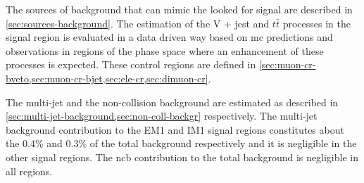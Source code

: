 The sources of background that can mimic the looked for signal are described in
\cref{sec:sources-background}. The estimation of the V + jest and $t \bar{t}$
processes in the signal region is evaluated in a data driven way based on
\gls{mc} predictions and observations in regions of the phase space where an
enhancement of these processes is expected. These control regions are defined in
\cref{sec:muon-cr-bveto,sec:muon-cr-bjet,sec:ele-cr,sec:dimuon-cr}.

The multi-jet and the non-collision background are estimated as described in
\cref{sec:multi-jet-background,sec:non-coll-backgr} respectively. The multi-jet
background contribution to the EM1 and IM1 signal regions constitutes about the
0.4\% and 0.3\% of the total background respectively and it is negligible in the
other signal regions. The \gls{ncb} contribution to the total background is
negligible in all regions.
